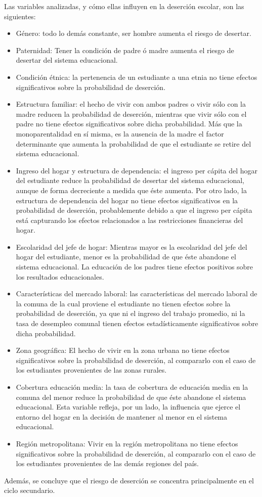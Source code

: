Las variables analizadas, y cómo ellas influyen en la deserción escolar, son las siguientes:
\begin{itemize}
\item Género: todo lo demás constante, ser hombre aumenta el riesgo de desertar.
\item Paternidad: Tener la condición de padre ó madre aumenta el riesgo de desertar del sistema educacional.
\item Condición étnica: la pertenencia de un estudiante a una etnia no tiene efectos significativos sobre la probabilidad de deserción. 
\item Estructura familiar: el hecho de vivir con ambos padres o vivir sólo con la madre reducen la probabilidad de deserción, mientras que vivir sólo con el padre no tiene efectos significativos sobre dicha probabilidad. Más que la monoparentalidad en sí misma, es la ausencia de la madre el factor determinante que aumenta la probabilidad de que el estudiante se retire del sistema educacional.
\item Ingreso del hogar y estructura de dependencia: el ingreso per cápita del hogar del estudiante reduce la probabilidad de desertar del sistema educacional, aunque de forma decreciente a medida que éste aumenta. Por otro lado, la estructura de dependencia del hogar no tiene efectos significativos en la probabilidad de deserción, probablemente debido a que el ingreso per cápita está capturando los efectos relacionados a las restricciones financieras del hogar.
\item Escolaridad del jefe de  hogar: Mientras mayor es la escolaridad del jefe del hogar del estudiante, menor es la probabilidad de que éste abandone el sistema educacional. La educación de los padres tiene efectos positivos sobre los resultados educacionales.
\item Características del mercado laboral: las características del mercado laboral de la comuna de la cual proviene el estudiante no tienen efectos sobre la probabilidad de deserción, ya que ni el ingreso del trabajo promedio, ni la tasa de desempleo comunal tienen efectos estadísticamente significativos sobre dicha probabilidad.
\item Zona geográfica: El hecho de vivir en la zona urbana no tiene efectos significativos sobre la probabilidad de deserción, al compararlo con el caso de los estudiantes provenientes de las zonas rurales.
\item Cobertura educación media: la tasa de cobertura de educación media en la comuna del menor reduce la probabilidad de que éste abandone el sistema educacional. Esta variable refleja, por un lado, la influencia que ejerce el entorno del hogar en la decisión de mantener al menor en el sistema educacional.
\item Región metropolitana: Vivir en la región metropolitana no tiene efectos significativos sobre la probabilidad de deserción, al compararlo con el caso de los estudiantes provenientes de las demás regiones del país.
\end{itemize}
Además, se concluye que el riesgo de deserción se concentra principalmente en el ciclo secundario.

